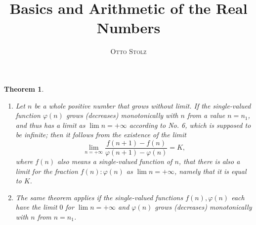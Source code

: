 \documentclass[a4paper]{amsbook}
\title{Basics and Arithmetic of the Real Numbers}
\author{\textsc{Otto Stolz}}
\newtheorem*{theorem*}{Theorem}
\begin{document}
\frontmatter
\maketitle

\mainmatter

\begin{theorem*}
  \leavevmode
  \begin{enumerate}
  \item \label{thm:1} Let \(n\) be a whole positive number that grows without limit.  If the single-valued function \(\varphi(n)\) grows (decreases) monotonically with \(n\) from a value \(n = n_1\), and thus has a limit as \(\lim n = +\infty\) according to No. 6, which is supposed to be infinite; then it follows from the existence of the limit
    \begin{equation*}
      \lim_{n=+\infty} \frac{f(n+1)-f(n)}{\varphi(n+1)-\varphi(n)} = K,
    \end{equation*}
    where \(f(n)\) also means a single-valued function of \(n\), that there is also a limit for the fraction \(f(n):\varphi(n)\) as \(\lim n = +\infty\), namely that it is equal to \(K\).

  \item The same theorem applies if the single-valued functions \(f(n), \varphi(n)\) each have the limit \(0\) for \(\lim n = +\infty\) and \(\varphi(n)\) grows (decreases) monotonically with \(n\) from \(n = n_1\).
  \end{enumerate}


\end{theorem*}
\end{document}
